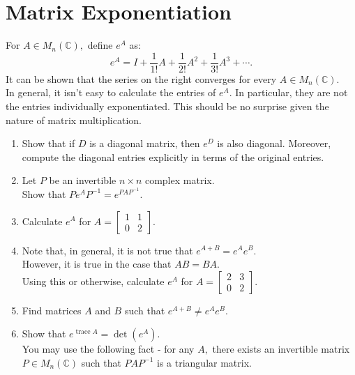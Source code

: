 \documentclass{article}
\begin{document}
\section{Matrix Exponentiation}
	For $A \in M_n(\mathbb{C}),$ define $e^A$ as:
	\[e^A = I + \frac{1}{1!}A + \frac{1}{2!}A^2 + \frac{1}{3!}A^3 + \cdots.\]
	It can be shown that the series on the right converges for every $A \in M_n(\mathbb{C}).$\\
	In general, it isn't easy to calculate the entries of $e^A.$ In particular, they are not the entries individually exponentiated. This should be no surprise given the nature of matrix multiplication.
	\begin{enumerate} 
		\item Show that if $D$ is a diagonal matrix, then $e^D$ is also diagonal. Moreover, compute the diagonal entries explicitly in terms of the original entries.
		\item Let $P$ be an invertible $n \times n$ complex matrix.\\
		Show that $Pe^AP^{-1} = e^{PAP^{-1}}.$
		\item Calculate $e^A$ for $A = \begin{bmatrix}
			1 & 1\\
			0 & 2
		\end{bmatrix}.$
		\item Note that, in general, it is not true that $e^{A+B} = e^Ae^B.$\\
		However, it is true in the case that $AB = BA.$\\
		Using this or otherwise, calculate $e^A$ for $A = \begin{bmatrix}
			2 & 3\\
			0 & 2
		\end{bmatrix}.$
		\item Find matrices $A$ and $B$ such that $e^{A+B} \neq e^Ae^B.$
		\item Show that $e^{\operatorname{trace} A} = \det(e^A).$\\
		You may use the following fact - for any $A,$ there exists an invertible matrix $P \in M_n(\mathbb{C})$ such that $PAP^{-1}$ is a triangular matrix.
	\end{enumerate}
\end{document}
